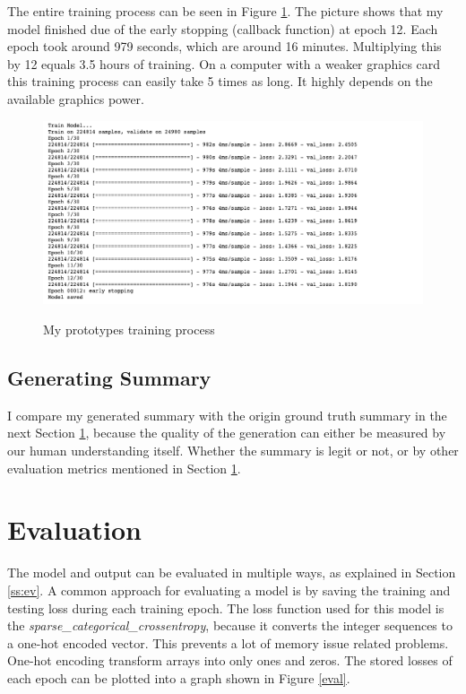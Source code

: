 The entire training process can be seen in Figure \ref{tpm}. The picture shows that my model finished due of the early stopping (callback function) at epoch 12. Each epoch took around 979 seconds, which are around 16 minutes. Multiplying this by 12 equals 3.5 hours of training. On a computer with a weaker graphics card this training process can easily take 5 times as long. It highly depends on the available graphics power. 

\begin{figure}
	\begin{center}
		\includegraphics[width=6.5in]{photos/training_process}\\
		\caption{My prototypes training process}\label{tpm}
	\end{center}
\end{figure}

\subsection{Generating Summary}

I compare my generated summary with the origin ground truth summary in the next Section \ref{ss:eval}, because the quality of the generation can either be measured by our human understanding itself. Whether the summary is legit or not, or by other evaluation metrics mentioned in Section \ref{ss:eval}.

\section{Evaluation}\label{ss:eval}

The model and output can be evaluated in multiple ways, as explained in Section \ref{ss:ev}. A common approach for evaluating a model is by saving the training and testing loss during each training epoch. The loss function used for this model is the \textit{sparse\_categorical\_crossentropy}, because it converts the integer sequences to a one-hot encoded vector. This prevents a lot of memory issue related problems. One-hot encoding transform arrays into only ones and zeros. The stored losses of each epoch can be plotted into a graph shown in Figure \ref{eval}.

